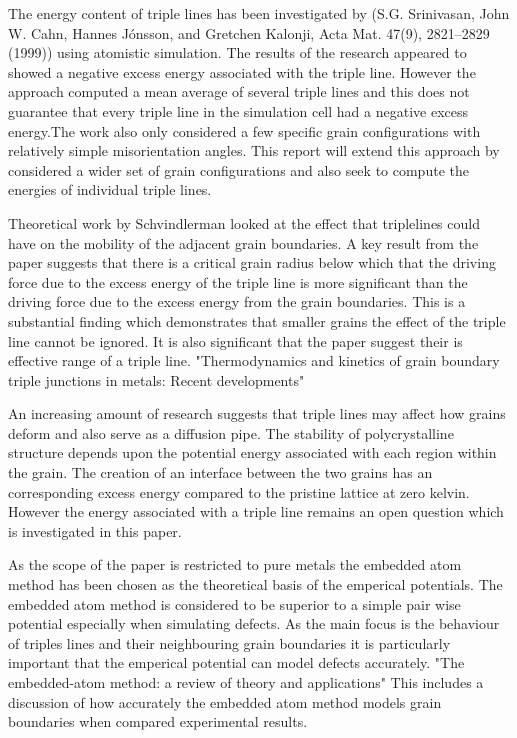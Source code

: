 \documentclass[12pt,a4paper]{book}
\begin{document}
The energy content of triple lines has been investigated by (S.G. Srinivasan, John W. Cahn, Hannes Jónsson, and Gretchen Kalonji, Acta Mat. 47(9), 2821–2829 (1999)) using atomistic simulation. The results of the research appeared to showed a negative excess energy associated with the triple line. However the approach computed a mean average of several triple lines and this does not guarantee that every triple line in the simulation cell had a negative excess energy.The work also only considered a few specific grain configurations with relatively simple misorientation angles. This report will extend this approach by considered a wider set of grain configurations and also seek to compute the energies of individual triple lines.

Theoretical work by Schvindlerman looked at the effect that triplelines could have on the mobility of the adjacent grain boundaries. A key result from the paper suggests that there is a critical grain radius below which that the driving force due to the excess energy of the triple line is more significant than the driving force due to the excess energy from the grain boundaries. This is a substantial finding which demonstrates that smaller grains the effect of the triple line cannot be ignored. It is also significant that the paper suggest their is effective range of a triple line.  "Thermodynamics and kinetics of grain boundary triple junctions in metals: Recent developments"

An increasing amount of research suggests that triple lines may affect how  grains deform and also serve as a diffusion pipe. The stability of polycrystalline structure depends upon the potential energy associated with each region within the grain. The creation of an interface between the two grains has an corresponding excess energy compared to the pristine lattice at zero kelvin. However the energy associated with a triple line remains an open question which is investigated in this paper.

As the scope of the paper is restricted to pure metals the embedded atom method has been chosen as the theoretical basis of the emperical potentials. The embedded atom method is considered to be superior to a simple pair wise potential especially when simulating defects. As the main focus is the behaviour of triples lines and their neighbouring grain boundaries it is particularly important that the emperical potential can model defects accurately. "The embedded-atom method:
a review of theory and applications" This includes a discussion of how accurately the embedded atom method models grain boundaries when compared  experimental results.
\end{document}
